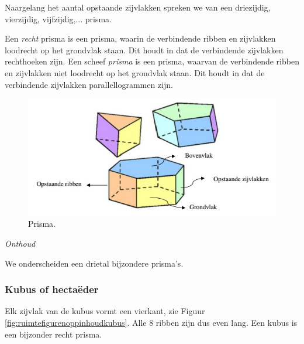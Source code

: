 Naargelang het aantal opstaande zijvlakken spreken we van een driezijdig, vierzijdig, vijfzijdig,... prisma.

Een \emph{recht} prisma is een prisma, waarin de verbindende ribben en zijvlakken loodrecht op het grondvlak staan. Dit houdt in dat de verbindende zijvlakken rechthoeken zijn. Een scheef \emph{prisma} is een prisma, waarvan de verbindende ribben en zijvlakken niet loodrecht op het grondvlak staan. Dit houdt in dat de verbindende zijvlakken parallellogrammen zijn.

\begin{figure}
	\centering
	\includegraphics[width=0.7\linewidth]{4_opp_inhoud_an_meetk/inputs/RuimteFigurenOppInhoud_prisma}
	\caption{Prisma.}
	\label{fig:ruimtefigurenoppinhoudprisma}
\end{figure}


\emph{Onthoud}


We onderscheiden een drietal bijzondere prisma's.

\subsubsection{Kubus of hecta\"eder}
Elk zijvlak van de kubus vormt een vierkant, zie Figuur \ref{fig:ruimtefigurenoppinhoudkubus}. Alle 8 ribben zijn dus even lang. Een kubus is een bijzonder recht prisma.

